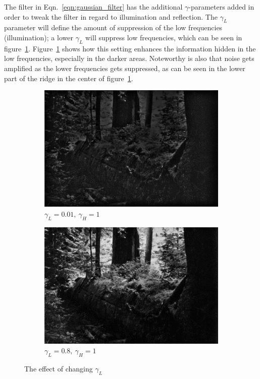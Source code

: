 		The filter in Eqn.~\ref{eqn:gaussian_filter} has the additional $\gamma$-parameters added in order to tweak
		the filter in regard to illumination and reflection. The $\gamma_L$ parameter
		will define the amount of suppression of the low frequencies (illumination); a lower $\gamma_L$
		will suppress low frequencies, which can be seen in figure~\ref{fig:low_freq_supp}.
		Figure~\ref{fig:low_freq_supp} shows how this setting enhances the information hidden 
		in the low frequencies, especially in the darker areas.
		Noteworthy is also that noise gets amplified as the lower frequencies gets suppressed, as can
		be seen in the lower part of the ridge in the center of figure~\ref{fig:low_freq_supp}.
		\begin{figure}[h!]
			\centering
				\begin{subfigure}[b]{0.5\linewidth}
					\includegraphics[width=0.9\linewidth]{pics/suppressed_low_frequences.png}
					\caption{$\gamma_L = 0.01,~\gamma_H = 1$}
					\label{fig:low_freq_supp}
				\end{subfigure}%
				\begin{subfigure}[b]{0.5\linewidth}
					\includegraphics[width=0.9\linewidth]{pics/non_suppressed_low_frequences.png}
					\caption{$\gamma_L = 0.8,~\gamma_H = 1$}
					\label{fig:low_freq_non_supp}
				\end{subfigure}
			\label{fig:various_low_gamma}
			\caption{The effect of changing $\gamma_L$}				
		\end{figure}		
